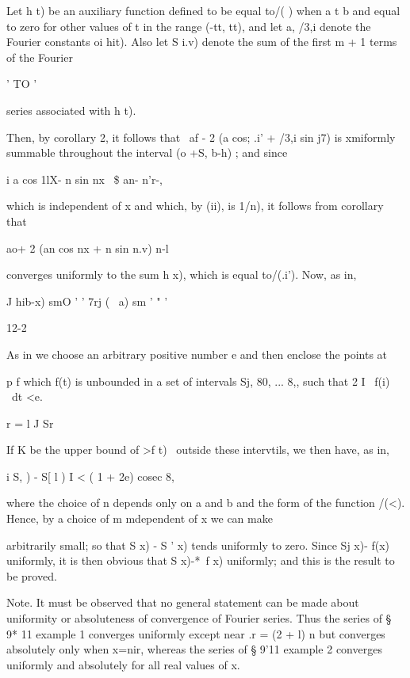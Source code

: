 Let h t) be an auxiliary function defined to be equal to/( ) when a t
b and equal to zero for other values of t in the range (-tt, tt), and
let a, /3,i denote the Fourier constants oi hit). Also let S i.v)
denote the sum of the first m + 1 terms of the Fourier

  ' TO '

series associated with h t).

Then, by corollary 2, it follows that \ af - 2 (a cos; .i' +
/3,i sin j7) is xmiformly summable throughout the interval (o +S, b-h)
; and since

i a cos 1lX- n sin nx \ \$ an- n'r-,

which is independent of x and which, by (ii), is 1/n), it
follows from corollary that

 ao+ 2 (an cos nx + n sin n.v) n-l

converges uniformly to the sum h x), which is equal to/(.i'). Now, as
in,

   J hib-x) smO ' ' 7rj ( \ a) sm ' " '

12-2

%
%

As in we choose an arbitrary positive number e and then enclose
the points at

p f which f(t) is unbounded in a set of intervals Sj, 80, ... 8,, such
that 2 I \ f(i) \ dt <e.

r = l J Sr

If K be the upper bound of >f t) \ outside these intervtils, we then
have, as in,

i S, ) - S[ l ) I < ( 1 + 2e) cosec 8,

where the choice of n depends only on a and b and the form of the
function /(<). Hence, by a choice of m mdependent of x we can make

arbitrarily small; so that S x) - S ' x) tends uniformly to zero.
Since Sj x)- f(x) uniformly, it is then obvious that S x)-*~f x)
uniformly; and this is the result to be proved.

Note. It must be observed that no general statement can be made about
uniformity or absoluteness of convergence of Fourier series. Thus the
series of § 9* 11 example 1 converges uniformly except near .r = (2 +
l) n but converges absolutely only when x=nir, whereas the series of §
9'11 example 2 converges uniformly and absolutely for all real values
of x.

